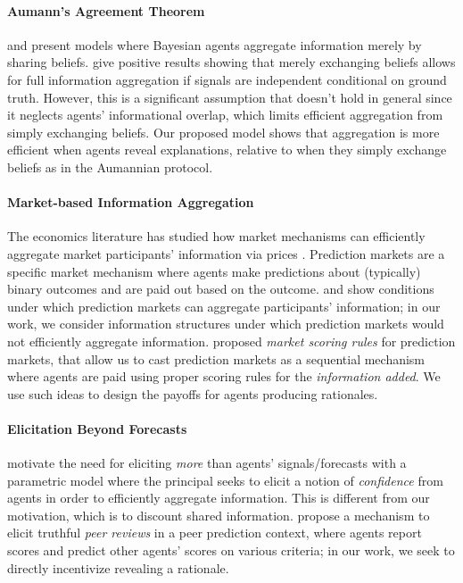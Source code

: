 \paragraph{Aumann's Agreement Theorem} \citet{aumann1976agreeing} and \citet{geanakoplos1982we} present models where Bayesian agents aggregate information merely by sharing beliefs. \citet{kong2022false} give positive results showing that merely exchanging beliefs allows for full information aggregation if signals are independent conditional on ground truth. However, this is a significant assumption that doesn't hold in general since it neglects agents' informational overlap, which limits efficient aggregation from simply exchanging beliefs. Our proposed model shows that aggregation is more efficient when agents reveal explanations, relative to when they simply exchange beliefs as in the Aumannian protocol.

\paragraph{Market-based Information Aggregation} The economics literature has studied how market mechanisms can efficiently aggregate market participants' information via prices \citep{fama1970efficient}. Prediction markets \citep{wolfers2004prediction, chen2010gaming} are a specific market mechanism where agents make predictions about (typically) binary outcomes and are paid out based on the outcome. \citet{ostrovsky2009information} and \citet{kong2022false} show conditions under which prediction markets can aggregate participants' information; in our work, we consider information structures under which prediction markets would not efficiently aggregate information.  \citet{hanson2003combinatorial} proposed \emph{market scoring rules} for prediction markets, that allow us to cast prediction markets as a sequential mechanism where agents are paid using proper scoring rules for the \emph{information added}. We use such ideas to design the payoffs for agents producing rationales.


\paragraph{Elicitation Beyond Forecasts} \citet{frongillo2015elicitation} motivate the need for eliciting \emph{more} than agents' signals/forecasts with a parametric model where the principal seeks to elicit a notion of \emph{confidence} from agents in order to efficiently aggregate information. This is different from our motivation, which is to discount shared information.  \citet{srinivasan2021auctions} propose a mechanism to elicit truthful \emph{peer reviews} in a peer prediction context, where agents report scores and predict other agents' scores on various criteria; in our work, we seek to directly incentivize revealing a rationale.


